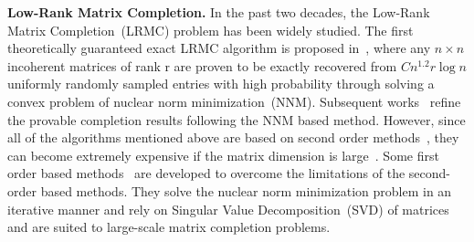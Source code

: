 \textbf{Low-Rank Matrix Completion.} In the past two decades, the Low-Rank Matrix Completion~(LRMC) problem has been widely studied. The first theoretically guaranteed exact LRMC algorithm is proposed in~\cite{candes2009exact}, where any $n \times n$ incoherent matrices of rank r are proven to be exactly recovered from $C n^{1.2}r\log n$ uniformly randomly sampled entries with high probability through solving a convex problem of nuclear norm minimization~(NNM). Subsequent works~\cite{candes2010power, chen2015incoherence, gross2011recovering, recht2011simpler} refine the provable completion results following the NNM based method. However, since all of the algorithms mentioned above are based on second order methods~\cite{liu2010interior}, they can become extremely expensive if the matrix dimension is large~\cite{cai2010singular}. Some first order based methods~\cite{cai2010singular, ji2009accelerated, mazumder2010spectral} are developed to overcome the limitations of the second-order based methods. They solve the nuclear norm minimization problem in an iterative manner and rely on Singular Value Decomposition~(SVD) of matrices and are suited to large-scale matrix completion problems.